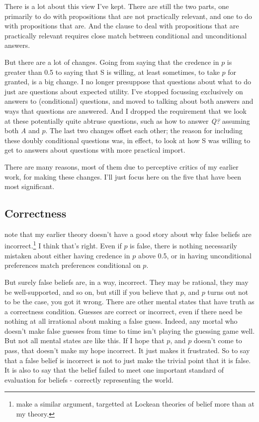 \documentclass[11pt,]{book}
\let\rmarkdownfootnote\footnote%
\def\footnote{\protect\rmarkdownfootnote}
\begin{document}
There is a lot about this view I've kept. There are still the two parts, one primarily to do with propositions that are not practically relevant, and one to do with propositions that are. And the clause to deal with propositions that are practically relevant requires close match between conditional and unconditional answers.

But there are a lot of changes. Going from saying that the credence in \(p\) is greater than 0.5 to saying that S is willing, at least sometimes, to take \(p\) for granted, is a big change. I no longer presuppose that questions about what to do just are questions about expected utility. I've stopped focussing exclusively on answers to (conditional) questions, and moved to talking about both answers and ways that questions are answered. And I dropped the requirement that we look at these potentially quite abtruse questions, such as how to answer \emph{Q?} assuming both \emph{A} and \(p\). The last two changes offset each other; the reason for including these doubly conditional questions was, in effect, to look at how S was willing to get to answers about questions with more practical import.

There are many reasons, most of them due to perceptive critics of my earlier work, for making these changes. I'll just focus here on the five that have been most significant.

\hypertarget{mecorrect}{%
\subsection{Correctness}\label{mecorrect}}

\citet{RossSchroeder2014} note that my earlier theory doesn't have a good story about why false beliefs are incorrect.\footnote{\citet{FantlMcGrath2009} make a similar argument, targetted at Lockean theories of belief more than at my theory.} I think that's right. Even if \(p\) is false, there is nothing necessarily mistaken about either having credence in \(p\) above 0.5, or in having unconditional preferences match preferences conditional on \(p\).

But surely false beliefs are, in a way, incorrect. They may be rational, they may be well-supported, and so on, but still if you believe that \(p\), and \(p\) turns out not to be the case, you got it wrong. There are other mental states that have truth as a correctness condition. Guesses are correct or incorrect, even if there need be nothing at all irrational about making a false guess. Indeed, any mortal who doesn't make false guesses from time to time isn't playing the guessing game well. But not all mental states are like this. If I hope that \(p\), and \(p\) doesn't come to pass, that doesn't make my hope incorrect. It just makes it frustrated. So to say that a false belief is incorrect is not to just make the trivial point that it is false. It is also to say that the belief failed to meet one important standard of evaluation for beliefs - correctly representing the world.
\end{document}
